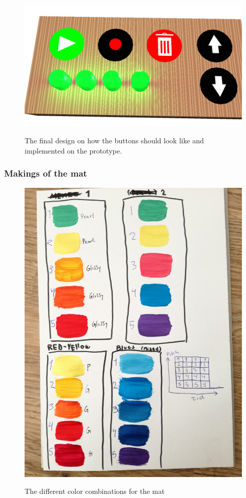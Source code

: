 \begin{figure}[H]
	\centering
	\includegraphics[width=0.7\linewidth]{figure/Design/buttonDesign}
	\label{fig:buttonDesign}
	\caption{The final design on how the buttons should look like and implemented on the prototype.}
	
\end{figure}


\subsubsection{Makings of the mat}

\begin{figure}[H]
	\centering
	\includegraphics[width=0.7\linewidth]{figure/Design/colors}
	\label{fig:colors}
	\caption{The different color combinations for the mat}
	
\end{figure}

